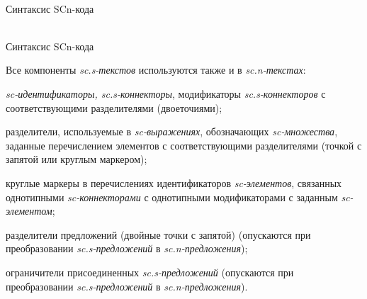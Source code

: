 \begin{frame}{\\Синтаксис SCn-кода}
	\topline
	\justifying
	\small{
		\begin{SCn}
			
			
		\end{SCn}
	}
\end{frame}

\begin{frame}{\\Синтаксис SCn-кода}
	\topline
	\justifying
	\vspace*{\fill}\\
	\small{
		Все компоненты \textit{sc.s-текстов} используются также и в \textit{sc.n-текстах}:
		\begin{textitemize}
			\item \textit{sc-идентификаторы, sc.s-коннекторы}, модификаторы \textit{sc.s-коннекторов} с соответствующими разделителями (двоеточиями);
			\item разделители, используемые в \textit{sc-выражениях}, обозначающих \textit{sc-множества}, заданные перечислением элементов с соответствующими разделителями (точкой с запятой или круглым маркером);
			\item круглые маркеры в перечислениях идентификаторов \textit{sc-элементов}, связанных однотипными \textit{sc-коннекторами} с однотипными модификаторами с заданным \textit{sc-элементом};
			\item разделители предложений (двойные точки с запятой) (опускаются при преобразовании \textit{sc.s-предложений} в \textit{sc.n-предложения});
			\item ограничители присоединенных \textit{sc.s-предложений} (опускаются при преобразовании \textit{sc.s-предложений} в \textit{sc.n-предложения}).
		\end{textitemize}
	}
\end{frame}

